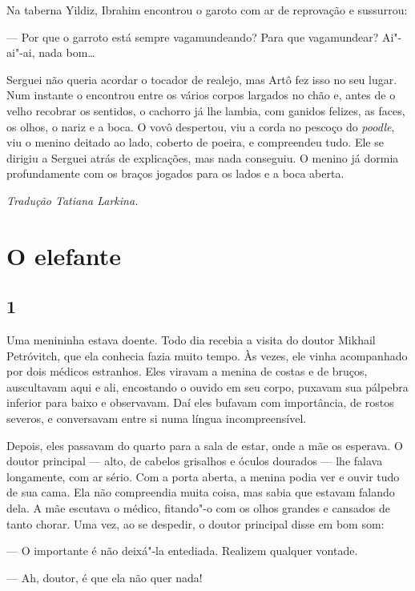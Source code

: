 Na taberna Yildiz, Ibrahim encontrou o garoto com ar de reprovação e
sussurrou:

--- Por que o garroto está sempre vagamundeando? Para que vagamundear?
Ai"-ai"-ai, nada bom\ldots{}

Serguei não queria acordar o tocador de realejo, mas Artô fez isso no seu
lugar. Num instante o encontrou entre os vários corpos largados no chão
e, antes de o velho recobrar os sentidos, o cachorro já lhe lambia, com
ganidos felizes, as faces, os olhos, o nariz e a boca. O vovô despertou,
viu a corda no pescoço do \emph{poodle}, viu o menino deitado ao lado,
coberto de poeira, e compreendeu tudo. Ele se dirigiu a Serguei atrás de
explicações, mas nada conseguiu. O menino já dormia profundamente com os
braços jogados para os lados e a boca aberta.


\medskip

{\footnotesize\hfill\emph{Tradução Tatiana Larkina.}}

\chapter{O elefante} \label{part11}

\section{1}

\noindent{}Uma menininha estava doente. Todo dia recebia a visita do doutor
Mikhail Petróvitch, que ela conhecia fazia muito tempo. Às vezes, ele
vinha acompanhado por dois médicos estranhos. Eles viravam a menina de
costas e de bruços, auscultavam aqui e ali, encostando o ouvido em seu
corpo, puxavam sua pálpebra inferior para baixo e observavam. Daí eles
bufavam com importância, de rostos severos, e conversavam entre si numa
língua incompreensível.

Depois, eles passavam do quarto para a sala de estar, onde a mãe os
esperava. O doutor principal --- alto, de cabelos grisalhos e óculos
dourados --- lhe falava longamente, com ar sério. Com a porta aberta, a
menina podia ver e ouvir tudo de sua cama. Ela não compreendia muita
coisa, mas sabia que estavam falando dela. A mãe escutava o médico,
fitando"-o com os olhos grandes e cansados de tanto chorar. Uma vez, ao
se despedir, o doutor principal disse em bom som:

--- O importante é não deixá"-la entediada. Realizem qualquer vontade.

--- Ah, doutor, é que ela não quer nada!


